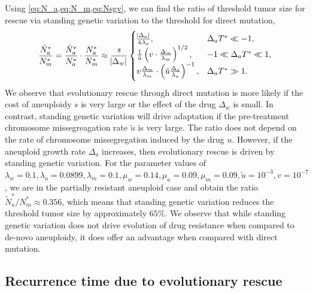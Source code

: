 \documentclass[12pt]{extarticle}
\begin{document}
Using \cref{eq:N_a,eq:N_m,eq:Nsgv}, we can find the ratio of threshold tumor size for rescue via standing genetic variation  to the threshold for direct mutation,
\begin{equation} \label{eq:N_sgv_ratio}
\frac{\tilde{N}^*_a}{N^*_m}=\frac{\tilde{N}^*_{a}}{N^*_{a}} \cdot \frac{N^*_a}{N^*_m} \approx \frac{s}{\abs{\Delta_w}}\begin{cases}
    \frac{\abs{\Delta_a}}{\tilde{u}\lambda_a} ,&
  \Delta_a T^* \ll -1 ,\\ 
  \frac{1}{\tilde{u}}\left(v \cdot \frac{\Delta_m}{\lambda_m}\right)^{1/2} ,&
  -1 \ll \Delta_a T^* \ll 1  ,\\ 
  v \frac{\Delta_m}{\lambda_m} \cdot \left(\tilde{u}\frac{\Delta_a}{\lambda_a}\right)^{-1}  ,&
   \Delta_a T^* \gg 1 .
  \end{cases}
\end{equation}
We observe that evolutionary rescue through direct mutation is more likely if the cost of aneuploidy $s$ is very large or the effect of the drug $\Delta_w$ is small.  In contrast, standing genetic variation will drive adaptation if the pre-treatment chromosome missegreagation rate $\tilde{u}$ is very large. The ratio does not depend on the rate of chromosome missegregation induced by the drug $u$. However, if the aneuploid growth rate $\Delta_a$ increases, then evolutionary rescue is driven by standing genetic variation. For the parameter values of  $\lambda_w=0.1, \lambda_a=0.0899,\lambda_m=0.1,\mu_w=0.14,\mu_a=0.09,\mu_m=0.09, \tilde{u}=10^{-3}, v=10^{-7}$, we are in the partially resistant aneuploid case and obtain the ratio $\tilde{N}^*_a/N^*_m \approx 0.356$, which means that standing genetic variation reduces the threshold tumor size by approximately $65\%$. We observe that while standing genetic variation does not drive evolution of drug resistance when compared to de-novo aneuploidy, it does offer an advantage when compared with direct mutation.


\subsection*{Recurrence time due to evolutionary rescue}
\end{document}
